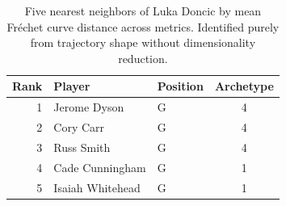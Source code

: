 \begin{table}[htbp]
  \centering\small
  \begin{tabular}{rllc}
    \toprule
    Rank & Player & Position & Archetype \\
    \midrule
    1 & Jerome Dyson & G & 4 \\
    2 & Cory Carr & G & 4 \\
    3 & Russ Smith & G & 4 \\
    4 & Cade Cunningham & G & 1 \\
    5 & Isaiah Whitehead & G & 1 \\
    \bottomrule
  \end{tabular}
  \caption{Five nearest neighbors of Luka Doncic by mean Fr\'{e}chet curve distance across metrics. Identified purely from trajectory shape without dimensionality reduction.}
  \label{tab:Luka_Doncic_frechet_curve_neighbors}
\end{table}

